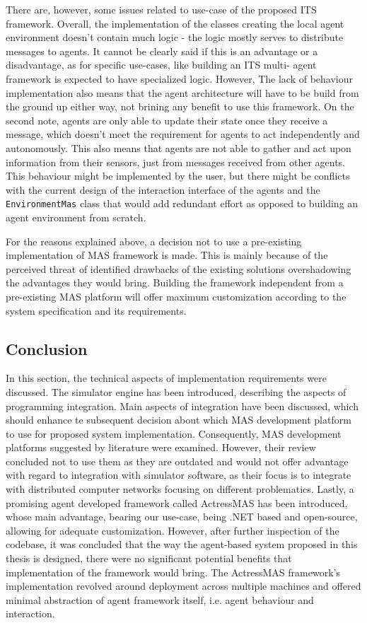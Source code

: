 \documentclass[main.tex]{subfiles}
\begin{document}
There are, however, some issues related to use-case of the proposed ITS framework. Overall, the implementation of the classes 
creating the local agent environment doesn't contain much logic - the logic mostly serves to distribute messages to agents. 
It cannot be clearly said if this is an advantage or a disadvantage, as for specific use-cases, like building an ITS multi-
agent framework is expected to have specialized logic. However, The lack of behaviour implementation also means that the 
agent architecture will have to be build from the ground up either way, not brining any benefit to use this framework. 
On the second note, agents are only able to update their state once they receive a message, which doesn't 
meet the requirement for agents to act independently and autonomously. This also means that agents are not able to gather 
and act upon information from their sensors, just from messages received from other agents. This behaviour might be implemented 
by the user, but there might be conflicts with the current design of the interaction interface of the agents and the 
\texttt{EnvironmentMas} class that would add redundant effort as opposed to building an agent environment from scratch. 

For the reasons explained above, a decision not to use a pre-existing implementation of MAS framework is made. This 
is mainly because of the perceived threat of identified drawbacks of the existing solutions overshadowing the advantages 
they would bring. Building the framework independent from a pre-existing MAS platform will offer maximum customization 
according to the system specification and its requirements. 

\subsection{Conclusion}

In this section, the technical aspects of implementation requirements were discussed. The
simulator engine has been introduced, describing the aspects of programming integration. Main
aspects of integration have been discussed, which should enhance te subsequent decision about
which MAS development platform to use for proposed system implementation. Consequently, MAS
development platforms suggested by literature were examined.  However, their review concluded
not to use them as they are outdated and would not offer advantage with regard to integration
with simulator software, as their focus is to integrate with distributed computer networks
focusing on different problematics. Lastly, a promising agent developed framework called 
ActressMAS has been introduced, whose main advantage, bearing our use-case, being .NET based
and open-source, allowing for adequate customization. However, after further inspection of the
codebase, it was concluded that the way the agent-based system proposed in this thesis is
designed, there were no significant potential benefits that implementation of the framework 
would bring. The ActressMAS framework's implementation revolved around deployment across 
multiple machines and offered minimal abstraction of agent framework itself, i.e. 
agent behaviour and interaction.
\end{document}
